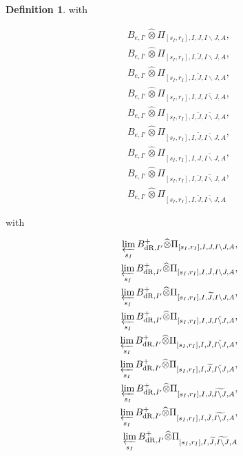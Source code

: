\documentclass[12pt]{amsart}
\theoremstyle{definition}
\newtheorem{definition}[theorem]{Definition}
\numberwithin{equation}{section}
\begin{document}
\begin{definition}
with 

\begin{align}
B_{e,I'}	\widehat{\otimes}\Pi_{[s_I,r_I],I,J,I\backslash J,A},\\	
B_{e,I'}	\widehat{\otimes}\Pi_{[s_I,r_I],I,\breve{J},I\backslash J,A},\\	
B_{e,I'}	\widehat{\otimes}\Pi_{[s_I,r_I],I,\widetilde{J},I\backslash J,A},\\
B_{e,I'}	\widehat{\otimes}\Pi_{[s_I,r_I],I,J,\breve{I\backslash J},A},\\	
B_{e,I'}	\widehat{\otimes}\Pi_{[s_I,r_I],I,\breve{J},\breve{I\backslash J},A},\\
B_{e,I'}	\widehat{\otimes}\Pi_{[s_I,r_I],I,\widetilde{J},\breve{I\backslash J},A},\\
B_{e,I'}	\widehat{\otimes}\Pi_{[s_I,r_I],I,J,\widetilde{I\backslash J},A},\\	
B_{e,I'}	\widehat{\otimes}\Pi_{[s_I,r_I],I,\breve{J},\widetilde{I\backslash J},A},\\
B_{e,I'} \widehat{\otimes}\Pi_{[s_I,r_I],I,\widetilde{J},\widetilde{I\backslash J},A}
\end{align}

with

\begin{align}
\varprojlim_{s_I}  B^+_{\mathrm{dR},I'}	\widehat{\otimes}\Pi_{[s_I,r_I],I,J,I\backslash J,A},\\	
\varprojlim_{s_I}  B^+_{\mathrm{dR},I'}	\widehat{\otimes}\Pi_{[s_I,r_I],I,\breve{J},I\backslash J,A},\\	
\varprojlim_{s_I} B^+_{\mathrm{dR},I'}	\widehat{\otimes}\Pi_{[s_I,r_I],I,\widetilde{J},I\backslash J,A},\\
\varprojlim_{s_I} B^+_{\mathrm{dR},I'}	\widehat{\otimes}\Pi_{[s_I,r_I],I,J,\breve{I\backslash J},A},\\	
\varprojlim_{s_I} B^+_{\mathrm{dR},I'}	\widehat{\otimes}\Pi_{[s_I,r_I],I,\breve{J},\breve{I\backslash J},A},\\
\varprojlim_{s_I} B^+_{\mathrm{dR},I'}	\widehat{\otimes}\Pi_{[s_I,r_I],I,\widetilde{J},\breve{I\backslash J},A},\\
\varprojlim_{s_I} B^+_{\mathrm{dR},I'}	\widehat{\otimes}\Pi_{[s_I,r_I],I,J,\widetilde{I\backslash J},A},\\	
\varprojlim_{s_I} B^+_{\mathrm{dR},I'}	\widehat{\otimes}\Pi_{[s_I,r_I],I,\breve{J},\widetilde{I\backslash J},A},\\
\varprojlim_{s_I} B^+_{\mathrm{dR},I'}	\widehat{\otimes}\Pi_{[s_I,r_I],I,\widetilde{J},\widetilde{I\backslash J},A}
\end{align}


\end{definition}
\end{document}
